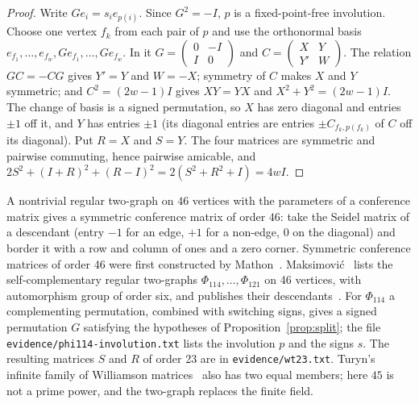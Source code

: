 \documentclass[10pt]{article}
\theoremstyle{definition}
\theoremstyle{remark}
\begin{document}
\begin{proof}
Write $Ge_i=s_ie_{p(i)}$. Since $G^2=-I$, $p$ is a fixed-point-free involution. Choose one vertex $f_k$ from each pair of $p$ and use the orthonormal basis $e_{f_1},\dots,e_{f_w},Ge_{f_1},\dots,Ge_{f_w}$. In it $G=\left(\begin{smallmatrix}0&-I\\I&0\end{smallmatrix}\right)$ and $C=\left(\begin{smallmatrix}X&Y\\Y'&W\end{smallmatrix}\right)$. The relation $GC=-CG$ gives $Y'=Y$ and $W=-X$; symmetry of $C$ makes $X$ and $Y$ symmetric; and $C^2=(2w-1)I$ gives $XY=YX$ and $X^2+Y^2=(2w-1)I$. The change of basis is a signed permutation, so $X$ has zero diagonal and entries $\pm1$ off it, and $Y$ has entries $\pm1$ (its diagonal entries are entries $\pm C_{f_k,p(f_k)}$ of $C$ off its diagonal). Put $R=X$ and $S=Y$. The four matrices are symmetric and pairwise commuting, hence pairwise amicable, and $2S^2+(I+R)^2+(R-I)^2=2(S^2+R^2+I)=4wI$.
\end{proof}

A nontrivial regular two-graph on $46$ vertices with the parameters of a conference matrix gives a symmetric conference matrix of order $46$: take the Seidel matrix of a descendant (entry $-1$ for an edge, $+1$ for a non-edge, $0$ on the diagonal) and border it with a row and column of ones and a zero corner. Symmetric conference matrices of order 46 were first constructed by Mathon~\cite{Mat78}. Maksimovi\'c~\cite[Table~12]{Ma23} lists the self-complementary regular two-graphs $\Phi_{114},\dots,\Phi_{121}$ on 46 vertices, with automorphism group of order six, and publishes their descendants~\cite{Ma23data}. For $\Phi_{114}$ a complementing permutation, combined with switching signs, gives a signed permutation $G$ satisfying the hypotheses of Proposition~\ref{prop:split}; the file \texttt{evidence/phi114-involution.txt} lists the involution $p$ and the signs $s$. The resulting matrices $S$ and $R$ of order 23 are in \texttt{evidence/wt23.txt}. Turyn's infinite family of Williamson matrices~\cite{Tu72} also has two equal members; here $45$ is not a prime power, and the two-graph replaces the finite field.
\end{document}
